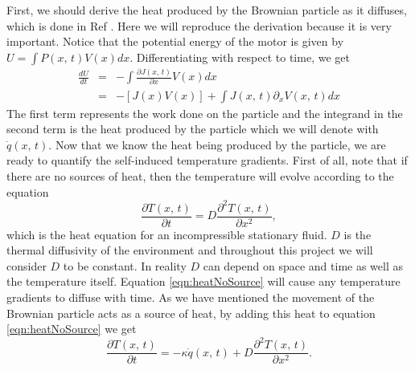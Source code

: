 First, we should derive the heat produced by the Brownian particle as it diffuses, which is done in Ref \cite{M.W.Jack2016}. Here we will reproduce the derivation because it is very important. Notice that the potential energy of the motor is given by $U = \int P(x, \, t) V(x) dx$. Differentiating with respect to time, we get
\begin{eqnarray}
\frac{d U}{d t} &=& -\int \frac{\partial J(x, \, t)}{\partial x} V(x) dx \\
		        &=& -[J(x) V(x)] + \int J(x, \, t) \partial_x V(x, \, t) dx
\end{eqnarray}
The first term represents the work done on the particle and the integrand in the second term is the heat produced by the particle which we will denote with $\dot{q}(x, \, t)$. Now that we know the heat being produced by the particle, we are ready to quantify the self-induced temperature gradients. First of all, note that if there are no sources of heat, then the temperature will evolve according to the equation
\begin{equation}
\frac{\partial T(x, \, t)}{\partial t} = D\frac{\partial^2 T(x, \, t)}{\partial x^2}, \label{eqn:heatNoSource}
\end{equation} 
which is the heat equation for an incompressible stationary fluid. $D$ is the thermal diffusivity of the environment and throughout this project we will consider $D$ to be constant. In reality $D$ can depend on space and time as well as the temperature itself. Equation \ref{eqn:heatNoSource} will cause any temperature gradients to diffuse with time. As we have mentioned the movement of the Brownian particle acts as a source of heat, by adding this heat to equation \ref{eqn:heatNoSource} we get
\begin{equation}
\frac{\partial T(x, \, t)}{\partial t} = -\kappa \dot{q}(x, \, t) + D \frac{\partial^2 T(x, \, t)}{\partial x^2}.
\end{equation}



